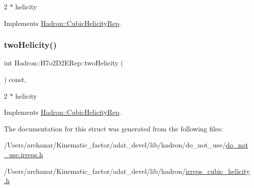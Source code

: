 2 $\ast$ helicity 

Implements \mbox{\hyperlink{structHadron_1_1CubicHelicityRep_af507aa56fc2747eacc8cb6c96db31ecc}{Hadron\+::\+Cubic\+Helicity\+Rep}}.

\mbox{\label{structHadron_1_1H7o2D2ERep_ab74ff7de742966a259984e56abc8dc12}} 
\subsubsection{\texorpdfstring{twoHelicity()}{twoHelicity()}\hspace{0.1cm}{\footnotesize\ttfamily [2/2]}}
{\footnotesize\ttfamily int Hadron\+::\+H7o2\+D2\+E\+Rep\+::two\+Helicity (\begin{DoxyParamCaption}{ }\end{DoxyParamCaption}) const\hspace{0.3cm}{\ttfamily [inline]}, {\ttfamily [virtual]}}

2 $\ast$ helicity 

Implements \mbox{\hyperlink{structHadron_1_1CubicHelicityRep_af507aa56fc2747eacc8cb6c96db31ecc}{Hadron\+::\+Cubic\+Helicity\+Rep}}.



The documentation for this struct was generated from the following files\+:\begin{DoxyCompactItemize}
\item 
/\+Users/archanar/\+Kinematic\+\_\+factor/adat\+\_\+devel/lib/hadron/do\+\_\+not\+\_\+use/\mbox{\hyperlink{do__not__use_8irreps_8h}{do\+\_\+not\+\_\+use.\+irreps.\+h}}\item 
/\+Users/archanar/\+Kinematic\+\_\+factor/adat\+\_\+devel/lib/hadron/\mbox{\hyperlink{lib_2hadron_2irreps__cubic__helicity_8h}{irreps\+\_\+cubic\+\_\+helicity.\+h}}\end{DoxyCompactItemize}
